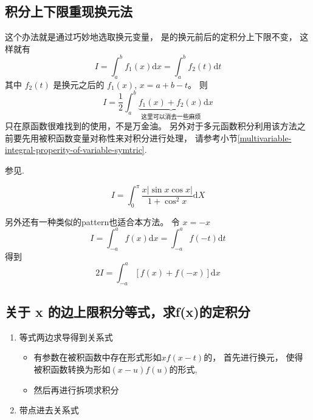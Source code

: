 \subsection{积分上下限重现换元法}
\label{integral-limits-regenerating-substituting}

这个办法就是通过巧妙地选取换元变量，
是的换元前后的定积分上下限不变，
这样就有
\[
    I = \int_a^b f_1(x) \mathrm{d}x = \int_a^b f_2(t) \mathrm{d}t
\]
其中 $f_2(t)$ 是换元之后的 $f_1(x)$, $x = a + b - t$。
则
\[
    I = \dfrac{1}{2} \int_a^b 
    \underbrace{f_1(x) + f_2(x)}_{{\mbox{这里可以消去一些麻烦}}}
    \mathrm{d}x
\]
只在原函数很难找到的使用，不是万金油。
另外对于多元函数积分利用该方法之前要先用被积函数变量对称性来对积分进行处理，
请参考小节\ref{multivariable-integral-properity-of-variable-symtric}.

参见\cite[page 110, pdf 121, example 8]{we}.

\begin{example}
    \[
        I = \int_0^{\pi} \dfrac{x |\sin x \cos x|}{1+\cos^2 x} \mathrm{d}X
    \]
    \cite[question 64]{w660}
\end{example}

另外还有一种类似的pattern也适合本方法。
令 $x = -x$
\[
    I = \int_{-a}^{a} f(x) \mathrm{d}x = \int_{-a}^{a} f(-t) \mathrm{d}t
\]
得到
\[
    2I = \int_{-a}^{a} \left[f(x) + f(-x)\right] \mathrm{d}x
\]

\subsection{关于 x 的边上限积分等式，求f(x)的定积分}
\begin{enumerate}
    \item 等式两边求导得到关系式
        \begin{itemize}
            \item 有参数在被积函数中存在形式形如$xf(x - t)$的，
                  首先进行换元，
                  使得被积函数转换为形如$(x - u)f(u)$的形式,
            \item 然后再进行拆项求积分
        \end{itemize}
    \item 带点进去关系式
\end{enumerate}

